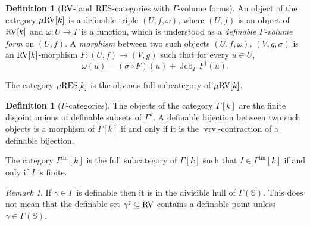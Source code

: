 \documentclass[12pt]{amsart}
\newcommand{\memph}[1]{{\color{magenta}\emph{#1}}}
\theoremstyle{plain}
\theoremstyle{definition}
\newtheorem{defn}[thm]{Definition}
\theoremstyle{remark}
\newtheorem{rem}[thm]{Remark}
\numberwithin{equation}{section}
\theoremstyle{plain}
\newcommand{\RV}{\textup{RV}}
\DeclareMathOperator{\jcb}{Jcb}
\newcommand{\0}{\emptyset}
\newcommand{\fun}{\longrightarrow}
\newcommand{\sub}{\subseteq}
\newcommand{\mgRV}{{\mu}{\RV}}
\newcommand{\RES}{\textup{RES}}
\newcommand{\mgRES}{{\mu}{\RES}}
\DeclareMathOperator{\fin}{fin}
\DeclareMathOperator{\vrv}{vrv}
\begin{document}
\begin{defn}[$\RV$- and $\RES$-categories with $\Gamma$-volume forms]\label{defn:RV:mu}
An object of the category $\mgRV[k]$ is a definable triple $(U, f, \omega)$, where $(U, f)$ is an object of $\RV[k]$ and $\omega : U \fun \Gamma$ is a function, which is understood as a \memph{definable $\Gamma$-volume form} on $(U, f)$. A \memph{morphism} between two such objects $(U,f, \omega)$, $(V, g, \sigma)$ is an $\RV[k]$-morphism $F: (U, f) \fun (V, g)$ such that for every $ u \in U$,
\begin{equation}\label{cond:mg2}
\omega(u) = (\sigma \circ F)(u) + \jcb_{\Gamma}  F^\dag(u).
\end{equation}

The category $\mgRES[k]$ is the obvious full subcategory of $\mgRV[k]$.
\end{defn}



\begin{defn}[$\Gamma$-categories]\label{def:Ga:cat}
The objects of the category $\Gamma[k]$ are the finite disjoint unions of definable subsets of $\Gamma^k$. A definable bijection between  two such objects is a  morphism of $\Gamma[k]$ if and only if it is the $\vrv$-contraction of a definable bijection.


The category $\Gamma^{\fin}[k]$ is the full subcategory of $\Gamma[k]$ such that $I \in \Gamma^{\fin}[k]$ if and only if $I$ is finite.
\end{defn}

\begin{rem}
If $\gamma \in \Gamma$ is definable then it is in the divisible hull of $\Gamma(\mathbb{S})$. This does not mean that the definable set $\gamma^{\sharp} \sub \RV$ contains a definable point unless $\gamma \in \Gamma(\mathbb{S})$.
\end{rem}
\end{document}
